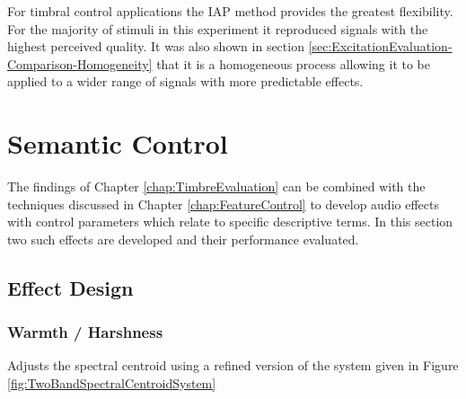 	For timbral control applications the IAP method provides the greatest flexibility. For the majority of stimuli in
	this experiment it reproduced signals with the highest perceived quality. It was also shown in section
	\ref{sec:ExcitationEvaluation-Comparison-Homogeneity} that it is a homogeneous process allowing it to be applied to
	a wider range of signals with more predictable effects.

\section{Semantic Control}
\label{sec:PerceptualExperiments-SemanticControl}
	The findings of Chapter \ref{chap:TimbreEvaluation} can be combined with the techniques discussed in Chapter
	\ref{chap:FeatureControl} to develop audio effects with control parameters which relate to specific descriptive
	terms. In this section two such effects are developed and their performance evaluated.

	\subsection{Effect Design}
	\label{sec:PerceptualExperiments-SemanticControl-EffectDesign}

		\subsubsection*{Warmth / Harshness}
			\note
			{
				Adjusts the spectral centroid using a refined version of the system given in Figure
				\ref{fig:TwoBandSpectralCentroidSystem}
			}

